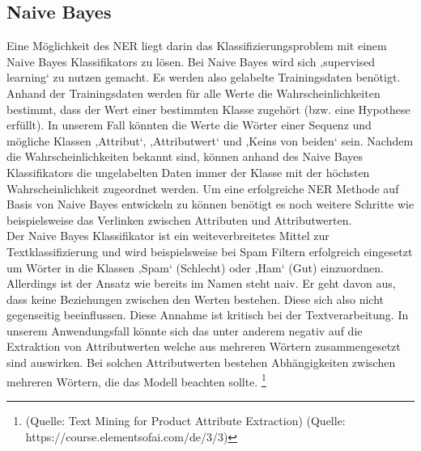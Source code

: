 \documentclass[paper=a4,12pt,listof=totoc]{scrartcl}%
\begin{document}
	\subsection{Naive Bayes}
	Eine Möglichkeit des NER liegt darin das Klassifizierungsproblem mit einem Naive Bayes Klassifikators zu lösen. Bei Naive Bayes wird sich ‚supervised learning‘ zu nutzen gemacht. Es werden also gelabelte Trainingsdaten benötigt. Anhand der Trainingsdaten werden für alle Werte die Wahrscheinlichkeiten bestimmt, dass der Wert einer bestimmten Klasse zugehört (bzw. eine Hypothese erfüllt). In unserem Fall könnten die Werte die Wörter einer Sequenz und mögliche Klassen ‚Attribut‘, ‚Attributwert‘ und ‚Keins von beiden‘ sein. Nachdem die Wahrscheinlichkeiten bekannt sind, können anhand des Naive Bayes Klassifikators die ungelabelten Daten immer der Klasse mit der höchsten Wahrscheinlichkeit zugeordnet werden. Um eine erfolgreiche NER Methode auf Basis von Naive Bayes entwickeln zu können benötigt es noch weitere Schritte wie beispielsweise das Verlinken zwischen Attributen und Attributwerten.\\
	Der Naive Bayes Klassifikator ist ein weiteverbreitetes Mittel zur Textklassifizierung und wird beispielsweise bei Spam Filtern erfolgreich eingesetzt um Wörter in die Klassen ‚Spam‘ (Schlecht) oder ‚Ham‘ (Gut) einzuordnen. Allerdings ist der Ansatz wie bereits im Namen steht naiv. Er geht davon aus, dass keine Beziehungen zwischen den Werten bestehen. Diese sich also nicht gegenseitig beeinflussen. Diese Annahme ist kritisch bei der Textverarbeitung. In unserem Anwendungsfall könnte sich das unter anderem negativ auf die Extraktion von Attributwerten welche aus mehreren Wörtern zusammengesetzt sind auswirken. Bei solchen Attributwerten bestehen Abhängigkeiten zwischen mehreren Wörtern, die das Modell beachten sollte.
	\footnote{(Quelle: Text Mining for Product Attribute Extraction)
	(Quelle: https://course.elementsofai.com/de/3/3)}
\end{document}
